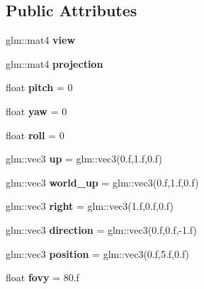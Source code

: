 \subsection*{Public Attributes}
\begin{DoxyCompactItemize}
\item 
\mbox{\label{structCamera_add93fedd6b9a6a6e2c784aeda624de83}} 
glm\+::mat4 {\bfseries view}
\item 
\mbox{\label{structCamera_a43555a0ae83f9ec696ee257e5fd48cf2}} 
glm\+::mat4 {\bfseries projection}
\item 
\mbox{\label{structCamera_ab56fcb39f580e8d2159cf2c9c6d9a65a}} 
float {\bfseries pitch} = 0
\item 
\mbox{\label{structCamera_ad76701b22630f2df28a0ae15f0497a3a}} 
float {\bfseries yaw} = 0
\item 
\mbox{\label{structCamera_a08d9c6119a859e664d74ca07db4fe3d3}} 
float {\bfseries roll} = 0
\item 
\mbox{\label{structCamera_a3fe5f351380fb118ffc600591769f049}} 
glm\+::vec3 {\bfseries up} = glm\+::vec3(0.f,1.f,0.f)
\item 
\mbox{\label{structCamera_a6c577ae7b35ade655292bbe1f7c0b862}} 
glm\+::vec3 {\bfseries world\+\_\+up} = glm\+::vec3(0.f,1.f,0.f)
\item 
\mbox{\label{structCamera_aebffcc6289dd99df7554b18d00a81161}} 
glm\+::vec3 {\bfseries right} = glm\+::vec3(1.f,0.f,0.f)
\item 
\mbox{\label{structCamera_aa91491698db51f70c62199d8c2213514}} 
glm\+::vec3 {\bfseries direction} = glm\+::vec3(0.f,0.f,-\/1.f)
\item 
\mbox{\label{structCamera_a04b5db2c530d8630660e8cfb93a4b3b5}} 
glm\+::vec3 {\bfseries position} = glm\+::vec3(0.f,5.f,0.f)
\item 
\mbox{\label{structCamera_a6cba4066109137fb0d23ee207205927c}} 
float {\bfseries fovy} = 80.f

\end{DoxyCompactItemize}
